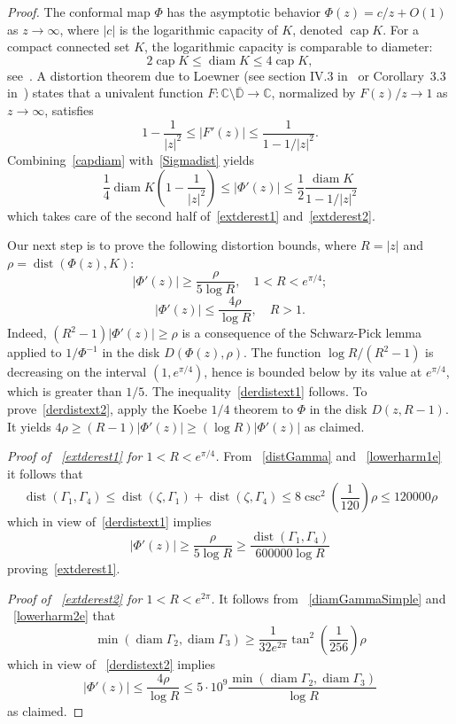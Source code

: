 \documentclass[11pt]{amsart}
\theoremstyle{remark}
\numberwithin{equation}{section}
\newcommand{\C}{\mathbb{C}}
\newcommand{\DD}{\mathbb{D}}
\newcommand{\abs}[1]{\lvert#1\rvert}
\DeclareMathOperator{\cp}{cap}
\DeclareMathOperator{\dist}{dist}
\DeclareMathOperator{\diam}{diam}
\begin{document}
\begin{proof} The conformal map $\Phi$  has the asymptotic behavior $\Phi(z) = c/z + O(1)$ as $z\to\infty$, where $|c|$ is the logarithmic capacity of $K$, denoted $\cp K$. For a compact connected set $K$, the logarithmic capacity is comparable to diameter: 
\begin{equation}\label{capdiam}
2\cp K\le \diam K\le 4\cp K,
\end{equation} 
see~\cite[\S 11.1]{Pomu}. A distortion theorem due to Loewner (see section IV.3 in~\cite{Golb} or Corollary~3.3 in~\cite{Pomu}) states that a univalent function $F\colon \C\setminus\overline{\DD}\to\C$, normalized by $F(z)/z\to 1$ as $z\to\infty$, satisfies
\begin{equation}\label{Sigmadist}
1-\frac{1}{\abs{z}^2} \le \abs{F'(z)}\le \frac{1}{1-1/\abs{z}^2}.
\end{equation}
Combining~\eqref{capdiam} with~\eqref{Sigmadist} yields
\[
\frac14 \diam  K\left(1-\frac{1}{\abs{z}^2}\right)
\le  \abs{\Phi'(z)} \le  \frac12 \frac{\diam K}{1-1/\abs{z}^2}
\]
which takes care of the second half of~\eqref{extderest1} and~\eqref{extderest2}.

Our next step is to prove the following distortion bounds, where $R = \abs{z}$ and $\rho = \dist(\Phi(z), K)$:
\begin{equation}\label{derdistext1}
\abs{\Phi'(z)} \ge \frac{\rho}{5 \log R} ,\quad  1 < R < e^{\pi/4};
\end{equation}
\begin{equation}\label{derdistext2}
\abs{\Phi'(z)} \le \frac{4 \rho}{\log R} ,\quad   R > 1. 
\end{equation}
Indeed, $(R^2-1)\abs{\Phi'(z)} \ge \rho$ is a consequence of the Schwarz-Pick lemma applied to $1/\Phi^{-1}$ in the disk $D(\Phi(z), \rho)$. The function $\log R/(R^2-1)$ is decreasing on the interval $(1, e^{\pi/4})$, hence is bounded below by its value at $e^{\pi/4}$, which is greater than $1/5$. The inequality~\eqref{derdistext1} follows.  To prove~\eqref{derdistext2}, apply the Koebe $1/4$ theorem to $\Phi$ in the disk $D(z, R-1)$. It yields 
$4\rho \ge (R-1)\abs{\Phi'(z)}\ge (\log R)\abs{\Phi'(z)}$ as claimed.   

\textit{Proof of ~\eqref{extderest1} for $1<R<e^{\pi/4}$.} 
From ~\eqref{distGamma} and ~\eqref{lowerharm1e} it follows that
\[
\dist(\Gamma_1, \Gamma_4) \le 
\dist(\zeta, \Gamma_1) + \dist(\zeta, \Gamma_4) \le 
8\csc^2 \left(\frac{1}{120}\right)\rho  \le 120000 \rho
\]
which in view of~\eqref{derdistext1}  implies 
\[
\abs{\Phi'(z)} \ge \frac{\rho}{5 \log R} \ge 
\frac{\dist(\Gamma_1, \Gamma_4)}{600000\log R}
\]
proving~\eqref{extderest1}.

\textit{Proof of ~\eqref{extderest2} for $1<R<e^{2\pi}$.} 
It follows from ~\eqref{diamGammaSimple} and ~\eqref{lowerharm2e} that
\[
\min(\diam \Gamma_2, \diam \Gamma_3) \ge  \frac{1}{32e^{2\pi}} \tan^2 \left(\frac{1}{256}\right)\rho 
\]
which in view of ~\eqref{derdistext2} implies  
\[
\abs{\Phi'(z)} \le \frac{4\rho}{\log R} \le 
5\cdot 10^9 \frac{\min(\diam \Gamma_2, \diam \Gamma_3)}{\log R}
\]
as claimed. 
\end{proof}
\end{document}
